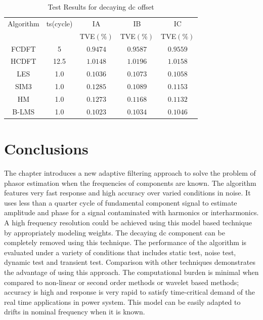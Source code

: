 \documentclass{UCF_ETD}
\begin{document}
\begin{table}[H] 
\renewcommand{\arraystretch}{1.3}
\caption{Test Results for decaying dc offset} \label{DecayingDCTable}
\centering
\begin{tabular}{c|c|c|c|c}
\hline
Algorithm &	ts(cycle)&	IA      &  IB 	    & IC 		\\
		  &          &TVE$(\%)$ & TVE$(\%)$ & TVE$(\%)$ \\
\hline\hline 
FCDFT	 &	5		&$0.9474$	&$0.9587$	&$0.9559$	\\
\hline
HCDFT	&	12.5	&$1.0148$	&$1.0196$	&$1.0158$	\\
\hline
LES	&	1.0		&$0.1036$	&$0.1073$	&$0.1058$	\\
\hline
SIM3	&	1.0		&$0.1285$	&$0.1089$	&$0.1153$	\\
\hline
HM		&   1.0		&$0.1273$	&$0.1168$	&$0.1132$	\\
\hline
B-LMS	&	1.0		&$0.1023$	&$0.1034$	&$0.1046$	\\
\hline
\end{tabular}
\end{table}


\section{Conclusions} \label{BLMSConclusions}

The chapter introduces a new adaptive filtering approach to solve the problem of phasor estimation when the frequencies of components are known. The algorithm features very fast response and high accuracy over varied conditions in noise. It uses less than a quarter cycle of fundamental component signal to estimate amplitude and phase for a signal contaminated with harmonics or interharmonics. A high frequency resolution could be achieved using this model based technique by appropriately modeling weights. The decaying dc component can be completely removed using this technique. The performance of the algorithm is evaluated under a variety of conditions that includes static test, noise test, dynamic test and transient test. Comparison with other techniques demonstrates the advantage of using this approach. The computational burden is minimal when compared to non-linear or second order methods or wavelet based methods; accuracy is high and response is very rapid to satisfy time-critical demand of the real time applications in power system. This model can be easily adapted to drifts in nominal frequency when it is known.
\end{document}
